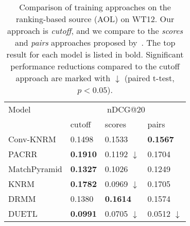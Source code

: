 \begin{table}
\small
\caption{Comparison of training approaches on the ranking-based source (AOL) on WT12. Our approach is \textit{cutoff}, and we compare to the \textit{scores} and \textit{pairs} approaches proposed by~\cite{dehghani2017neural}. The top result for each model is listed in bold. Significant performance reductions compared to the cutoff approach are marked with $\downarrow$ (paired t-test, $p<0.05$).}
\label{tab:ranking-based-approaches}
\begin{tabular}{llll}
\toprule
Model & \multicolumn{3}{c}{nDCG@20}\\ \cmidrule(lr){2-4} 
        &cutoff & scores~\cite{dehghani2017neural} & pairs~\cite{dehghani2017neural} \\
\midrule


Conv-KNRM & 0.1498 & 0.1533 & \bf0.1567  \\
PACRR & \bf0.1910 & 0.1192 $\downarrow$ & 0.1704  \\
MatchPyramid & \bf0.1327 & 0.1026 & 0.1249  \\
KNRM & \bf0.1782 & 0.0969 $\downarrow$ & 0.1705  \\
DRMM & 0.1380 & \bf0.1614 & 0.1574  \\
DUETL & \bf0.0991 & 0.0705 $\downarrow$ & 0.0512 $\downarrow$ \\


\bottomrule
\end{tabular}
\end{table}